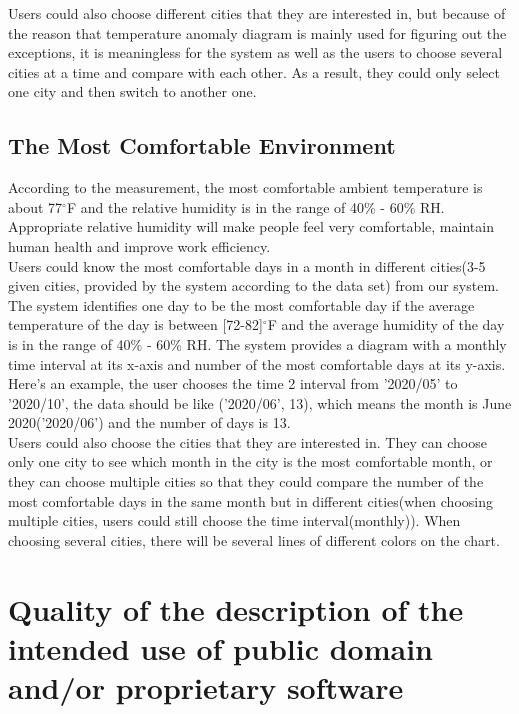 \documentclass[]{article}
\begin{document}
	\noindent Users could also choose different cities that they are interested in, but because of the reason that temperature anomaly diagram is mainly used for figuring out the exceptions, it is meaningless for the system as well as the users to choose several cities at a time and compare with each other. As a result, they could only select one city and then switch to another one.  
	
	\subsection{The Most Comfortable Environment}
	
	According to the measurement, the most comfortable ambient temperature is about 77$ ^\circ$F and the relative humidity is in the range of 40\% - 60\% RH. Appropriate relative humidity will make people feel very comfortable, maintain human health and improve work efficiency.  \\
	
	\noindent Users could know the most comfortable days in a month in different cities(3-5 given cities, provided by the system according to the data set) from our system. The system identifies one day to be the most comfortable day if the average temperature of the day is between [72-82]$ ^\circ$F and the average humidity of the day is in the range of 40\% - 60\% RH. The system provides a diagram with a monthly time interval at its x-axis and number of the most comfortable days at its y-axis. Here's an example, the user chooses the time 2 interval from '2020/05' to '2020/10', the data should be like ('2020/06', 13), which means the month is June 2020('2020/06') and the number of days is 13. \\
	
	\noindent Users could also choose the cities that they are interested in. They can choose only one city to see which month in the city is the most comfortable month, or they can choose multiple cities so that they could compare the number of the most comfortable days in the same month but in different cities(when choosing multiple cities, users could still choose the time interval(monthly)). When choosing several cities, there will be several lines of different colors on the chart.
	

\section{Quality of the description of the intended use of public domain and/or proprietary software}
\end{document}

